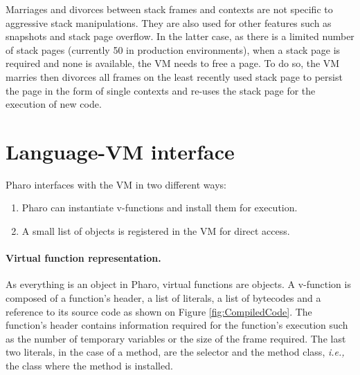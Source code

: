\documentclass[a4paper,12pt,twoside]{../includes/ThesisStyle}
\begin{document}

Marriages and divorces between stack frames and contexts are not specific to aggressive stack manipulations. They are also used for other features such as snapshots and stack page overflow. In the latter case, as there is a limited number of stack pages (currently 50 in production environments), when a stack page is required and none is available, the VM needs to free a page. To do so, the VM marries then divorces all frames on the least recently used stack page to persist the page in the form of single contexts and re-uses the stack page for the execution of new code. 



\section{Language-VM interface}

Pharo interfaces with the VM in two different ways:
\begin{enumerate}
	\item Pharo can instantiate v-functions and install them for execution.
	\item A small list of objects is registered in the VM for direct access.
\end{enumerate}

\paragraph{Virtual function representation.}

As everything is an object in Pharo, virtual functions are objects. A v-function is composed of a function's header, a list of literals, a list of bytecodes and a reference to its source code as shown on Figure \ref{fig:CompiledCode}. The function's header contains information required for the function's execution such as the number of temporary variables or the size of the frame required. The last two literals, in the case of a method, are the selector and the method class, \emph{i.e.,} the class where the method is installed.
\end{document}
